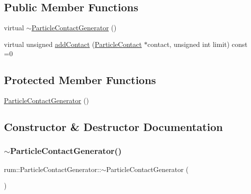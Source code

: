 \subsection*{Public Member Functions}
\begin{DoxyCompactItemize}
\item 
virtual \mbox{\hyperlink{classrum_1_1_particle_contact_generator_a79743de72e95cfa6db189bc9f0d99b71}{$\sim$\+Particle\+Contact\+Generator}} ()
\item 
virtual unsigned \mbox{\hyperlink{classrum_1_1_particle_contact_generator_a343d3df815d7e170458fe937fe82aad5}{add\+Contact}} (\mbox{\hyperlink{classrum_1_1_particle_contact}{Particle\+Contact}} $\ast$contact, unsigned int limit) const =0
\end{DoxyCompactItemize}
\subsection*{Protected Member Functions}
\begin{DoxyCompactItemize}
\item 
\mbox{\hyperlink{classrum_1_1_particle_contact_generator_aefec37ffef72a54397c6952c6d2e65ba}{Particle\+Contact\+Generator}} ()
\end{DoxyCompactItemize}


\subsection{Constructor \& Destructor Documentation}
\mbox{\label{classrum_1_1_particle_contact_generator_a79743de72e95cfa6db189bc9f0d99b71}} 
\subsubsection{\texorpdfstring{$\sim$\+Particle\+Contact\+Generator()}{~ParticleContactGenerator()}}
{\footnotesize\ttfamily rum\+::\+Particle\+Contact\+Generator\+::$\sim$\+Particle\+Contact\+Generator (\begin{DoxyParamCaption}{ }\end{DoxyParamCaption})\hspace{0.3cm}{\ttfamily [virtual]}}


